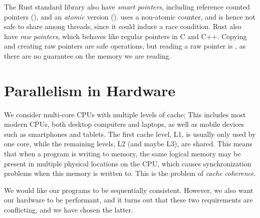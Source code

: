 \documentclass[a4paper,twoside]{report}
\begin{document}
The Rust standard library also have \emph{smart pointers}, including reference
counted pointers (), and an \emph{atomic} version
().  uses a non-atomic counter, and is hence not
safe to share among threads, since it could induce a race condition.
Rust also have \emph{raw pointers}, which behaves like regular pointers in C
and C++.  Copying and creating raw pointers are safe operations, but reading a
raw pointer is , as there are no guarantee on the memory we are
reading.








\section{Parallelism in Hardware}
   We consider multi-core CPUs with multiple levels of cache;
This includes most modern CPUs, both desktop computers and laptops, as well as
mobile devices such as smartphones and tablets.  The first cache level, L1, is
usually only used by one core, while the remaining levels, L2 (and maybe L3),
are shared.  This means that when a program is writing to memory, the same
logical memory may be present in multiple physical locations on the CPU, which
causes synchronization problems when this memory is written to. This is the
problem of \emph{cache coherence}.

We would like our programs to be sequentially consistent.  However, we also
want our hardware to be performant, and it turns out that these two
requirements are conflicting, and we have chosen the latter.
\end{document}
